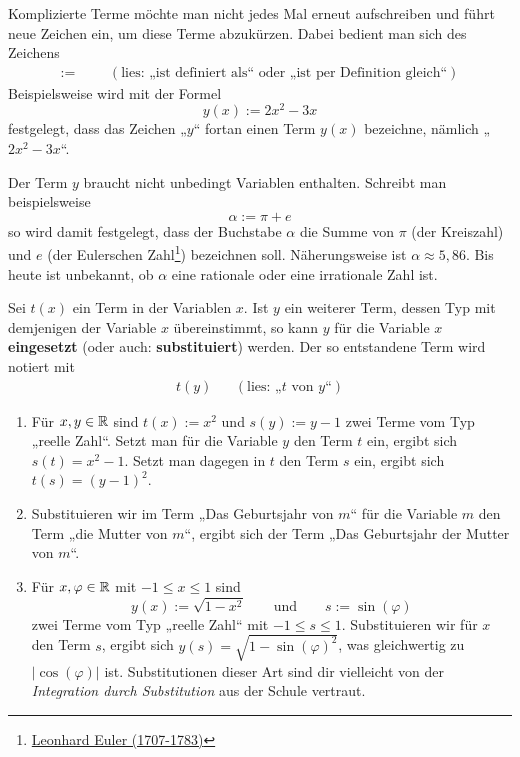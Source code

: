 \begin{nota}[$:=$]
    Komplizierte Terme möchte man nicht jedes Mal erneut aufschreiben und führt neue Zeichen ein, um diese Terme abzukürzen. Dabei bedient man sich des Zeichens
    \begin{align*}
        := &&& (\text{lies: „ist definiert als“ oder „ist per Definition gleich“})
    \end{align*}
    Beispielsweise wird mit der Formel
        \[ y(x) := 2x^2-3x \]
    festgelegt, dass das Zeichen „$y$“ fortan einen Term $y(x)$ bezeichne, nämlich „$2x^2-3x$“.

    Der Term $y$ braucht nicht unbedingt Variablen enthalten. Schreibt man beispielsweise
        \[ \alpha:= \pi + e\]
    so wird damit festgelegt, dass der Buchstabe $\alpha$ die Summe von $\pi$ (der Kreiszahl) und $e$ (der Eulerschen Zahl\footnote{\href{https://de.wikipedia.org/wiki/Leonhard_Euler}{Leonhard Euler (1707-1783)}}) bezeichnen soll. Näherungsweise ist $\alpha \approx 5{,}86$. Bis heute ist unbekannt, ob $\alpha$ eine rationale oder eine irrationale Zahl ist.
\end{nota}


\begin{defin}[* Variablensubstitution] \label{def:substitution}
    Sei $t(x)$ ein Term in der Variablen $x$. Ist $y$ ein weiterer Term, dessen Typ mit demjenigen der Variable $x$ übereinstimmt, so kann $y$ für die Variable $x$ \textbf{eingesetzt} (oder auch: \textbf{substituiert}) werden. Der so entstandene Term wird notiert mit
    \begin{align*}
        t(y) && (\text{lies: „$t$ von $y$“})
    \end{align*}
\end{defin}


\begin{bsp}[*] \quad \label{bsp:substitution}
    \begin{enumerate}
        \item Für $x,y\in\mathbb R$ sind $t(x):=x^2$ und $s(y):=y-1$ zwei Terme vom Typ „reelle Zahl“. Setzt man für die Variable $y$ den Term $t$ ein, ergibt sich $s(t)=x^2-1$. Setzt man dagegen in $t$ den Term $s$ ein, ergibt sich $t(s)=(y-1)^2$.
        \item Substituieren wir im Term „Das Geburtsjahr von $m$“ für die Variable $m$ den Term „die Mutter von $m$“, ergibt sich der Term „Das Geburtsjahr der Mutter von $m$“.
        \item Für $x,\varphi\in \mathbb R$ mit $-1\le x\le 1$ sind
            \[ y(x):=\sqrt{1-x^2} \qquad\text{und}\qquad s:=\sin(\varphi) \]
        zwei Terme vom Typ „reelle Zahl“ mit $-1\le s\le 1$. Substituieren wir für $x$ den Term $s$, ergibt sich $y(s)=\sqrt{1-\sin(\varphi)^2}$, was gleichwertig zu $\vert\cos(\varphi)\vert$ ist. Substitutionen dieser Art sind dir vielleicht von der \emph{Integration durch Substitution} aus der Schule vertraut.
    \end{enumerate}
\end{bsp}


